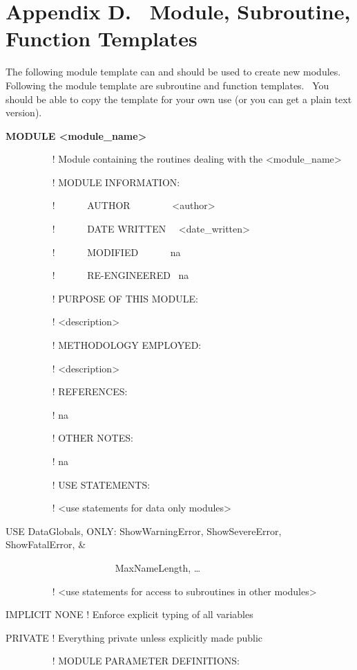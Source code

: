 \chapter{Appendix D.~ Module, Subroutine, Function Templates}\label{appendix-d.-module-subroutine-function-templates}

The following module template can and should be used to create new modules.~ Following the module template are subroutine and function templates.~ You should be able to copy the template for your own use (or you can get a plain text version).

\textbf{MODULE \textless{}module\_name\textgreater{}}

~~~~~~~~~ ! Module containing the routines dealing with the \textless{}module\_name\textgreater{}

~~~~~~~~~ ! MODULE INFORMATION:

~~~~~~~~~ !~~~~~~ AUTHOR~~~~~~~~ \textless{}author\textgreater{}

~~~~~~~~~ !~~~~~~ DATE WRITTEN~~ \textless{}date\_written\textgreater{}

~~~~~~~~~ !~~~~~~ MODIFIED~~~~~~ na

~~~~~~~~~ !~~~~~~ RE-ENGINEERED~ na

~~~~~~~~~ ! PURPOSE OF THIS MODULE:

~~~~~~~~~ ! \textless{}description\textgreater{}

~~~~~~~~~ ! METHODOLOGY EMPLOYED:

~~~~~~~~~ ! \textless{}description\textgreater{}

~~~~~~~~~ ! REFERENCES:

~~~~~~~~~ ! na

~~~~~~~~~ ! OTHER NOTES:

~~~~~~~~~ ! na

~~~~~~~~~ ! USE STATEMENTS:

~~~~~~~~~ ! \textless{}use statements for data only modules\textgreater{}

USE DataGlobals, ONLY: ShowWarningError, ShowSevereError, ShowFatalError, \&

~~~~~~~~~~~~~~~~~~~~~~ MaxNameLength, \ldots{}

~~~~~~~~~ ! \textless{}use statements for access to subroutines in other modules\textgreater{}

IMPLICIT NONE ! Enforce explicit typing of all variables

PRIVATE ! Everything private unless explicitly made public

~~~~~~~~~ ! MODULE PARAMETER DEFINITIONS:

